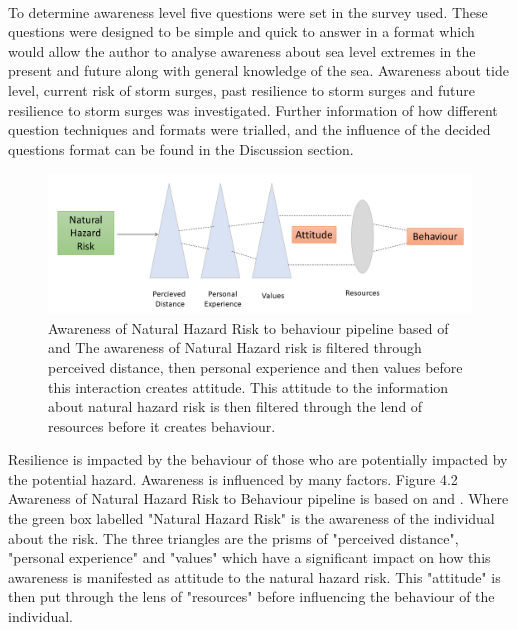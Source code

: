 \paragraph{}
To determine awareness level five questions were set in the survey used. These questions were designed to be simple and quick to answer in a format which would allow the author to analyse awareness about sea level extremes in the present and future along with general knowledge of the sea. Awareness about tide level, current risk of storm surges, past resilience to storm surges and future resilience to storm surges was investigated. Further information of how different question techniques and formats were trialled, and the influence of the decided questions format can be found in the Discussion section.

\begin{figure}[h]
    \centering
    \includegraphics[width=1\textwidth]{fig_theory/awareness lujala and whitmarsh.png}
     \caption{Awareness of Natural Hazard Risk to behaviour pipeline based of \cite{lujala_climate_2015} and \cite{whitmarsh_are_2008} The awareness of Natural Hazard risk is filtered through perceived distance, then personal experience and then values before this interaction creates attitude. This attitude to the information about natural hazard risk is then filtered through the lend of resources before it creates behaviour.}
    \label{fig:my_awareness}
\end{figure}

Resilience is impacted by the behaviour of those who are potentially impacted by the potential hazard. Awareness is influenced by many factors. Figure 4.2 Awareness of Natural Hazard Risk to Behaviour pipeline is based on \cite{whitmarsh_are_2008} and \cite{lujala_climate_2015} . Where the green box labelled "Natural Hazard Risk" is the awareness of the individual about the risk. The three triangles are the prisms of "perceived distance", "personal experience" and "values" which have a significant impact on how this awareness is manifested as attitude to the natural hazard risk. This "attitude" is then put through the lens of "resources" before influencing the behaviour of the individual. 
